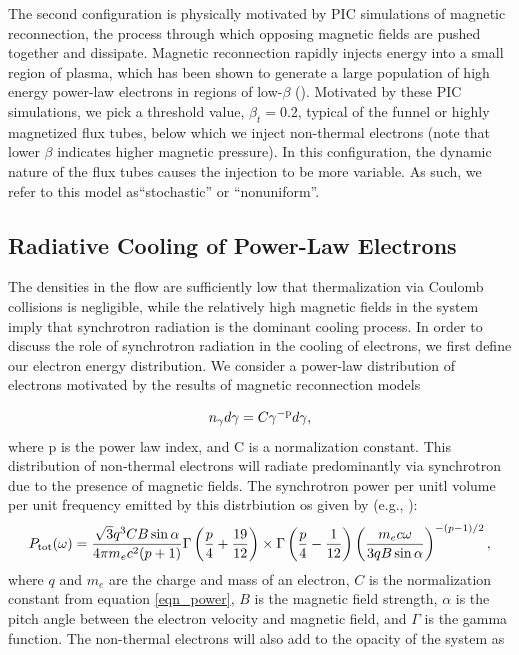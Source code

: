 The second configuration is physically motivated by
PIC simulations of magnetic reconnection, the process
through which opposing magnetic fields are pushed together and dissipate. Magnetic reconnection rapidly injects energy into a small region of plasma, which has
been shown to generate a large population of high energy power-law electrons in regions of low-$\beta$ (\citealt{sironi2014}). Motivated by these PIC simulations,
we pick a threshold value, $\beta_{t} = 0.2$, typical of the funnel
or highly magnetized flux tubes, below which we inject
non-thermal electrons (note that lower $\beta$ indicates higher
magnetic pressure). In this configuration, the dynamic
nature of the flux tubes causes the injection to be more
variable. As such, we refer to this model as``stochastic”
or ``nonuniform”.
\subsection{Radiative Cooling of Power-Law Electrons}
The densities in the flow are sufficiently low that thermalization via Coulomb collisions is negligible, while the
relatively high magnetic fields in the system imply that
synchrotron radiation is the dominant cooling process.
In order to discuss the role of synchrotron radiation in
the cooling of electrons, we first define our electron energy distribution.
We consider a power-law distribution of electrons motivated by the results of magnetic reconnection models

\begin{equation}
	n_{\gamma}d\gamma = C \gamma^{-\rm{p}}d\gamma,
	\label{eqn_power}
\end{equation}
where p is the power law index, and C is a normalization constant.  This distribution of non-thermal electrons will radiate predominantly via synchrotron due to the presence of magnetic fields.  The synchrotron power per unitl volume per unit frequency emitted by this distrbiution os given by (e.g., \citealt{rybicki1979}):
\begin{equation}
	P_{\rm{tot}}(\omega)=\frac{\sqrt{3}q^3 C B \sin \alpha}{4 \pi m_{e} c^2 (p+1)}\Gamma\left(\frac{p}{4}+\frac{19}{12}\right) \times \Gamma\left(\frac{p}{4}-\frac{1}{12}\right)\left(\frac{m_e c \omega}{3 qB\sin\alpha}\right)^{-(p-1)/2},
	\label{eqn_synch_power}
\end{equation}
where $q$ and $m_e$ are the charge and mass of an electron, $C$ is the normalization constant from equation \ref{eqn_power}, $B$ is the magnetic field strength, $\alpha$ is the pitch angle between the electron velocity and magnetic field, and $\Gamma$ is the gamma function.  The non-thermal electrons will also add to the opacity of the system as

